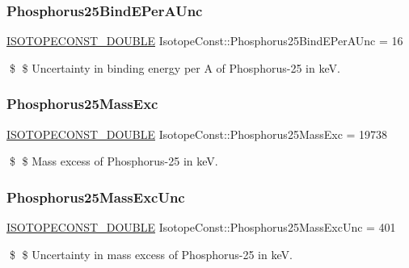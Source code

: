 \subsubsection{\texorpdfstring{Phosphorus25\+Bind\+E\+Per\+A\+Unc}{Phosphorus25BindEPerAUnc}}
{\footnotesize\ttfamily \mbox{\hyperlink{group___isotope_const-_macros_ga8f45a7272ce02c0b4c65c44636ed719a}{I\+S\+O\+T\+O\+P\+E\+C\+O\+N\+S\+T\+\_\+\+D\+O\+U\+B\+LE}} Isotope\+Const\+::\+Phosphorus25\+Bind\+E\+Per\+A\+Unc = 16}

\$ \$ Uncertainty in binding energy per A of Phosphorus-\/25 in keV. \mbox{\label{group___isotope_const-_phosphorus-_p25_ga3c2e94951ce2a847d5fe7a45ca7b48d3}} 
\subsubsection{\texorpdfstring{Phosphorus25\+Mass\+Exc}{Phosphorus25MassExc}}
{\footnotesize\ttfamily \mbox{\hyperlink{group___isotope_const-_macros_ga8f45a7272ce02c0b4c65c44636ed719a}{I\+S\+O\+T\+O\+P\+E\+C\+O\+N\+S\+T\+\_\+\+D\+O\+U\+B\+LE}} Isotope\+Const\+::\+Phosphorus25\+Mass\+Exc = 19738}

\$ \$ Mass excess of Phosphorus-\/25 in keV. \mbox{\label{group___isotope_const-_phosphorus-_p25_gae99510d1266b5da8f0795c7d077b4fc6}} 
\subsubsection{\texorpdfstring{Phosphorus25\+Mass\+Exc\+Unc}{Phosphorus25MassExcUnc}}
{\footnotesize\ttfamily \mbox{\hyperlink{group___isotope_const-_macros_ga8f45a7272ce02c0b4c65c44636ed719a}{I\+S\+O\+T\+O\+P\+E\+C\+O\+N\+S\+T\+\_\+\+D\+O\+U\+B\+LE}} Isotope\+Const\+::\+Phosphorus25\+Mass\+Exc\+Unc = 401}

\$ \$ Uncertainty in mass excess of Phosphorus-\/25 in keV. \mbox{\label{group___isotope_const-_phosphorus-_p25_ga174043ce307d1d3e2aba5b29657a9403}} 
